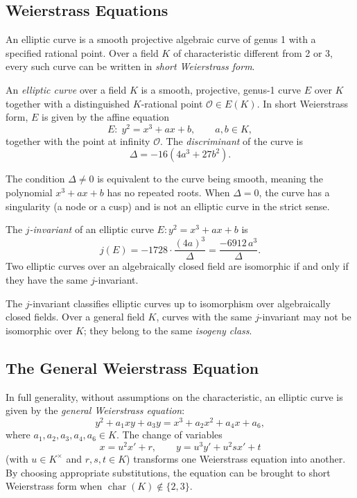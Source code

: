\subsection{Weierstrass Equations}

An elliptic curve is a smooth projective algebraic curve of genus 1 with a specified rational point. Over a field $K$ of characteristic different from 2 or 3, every such curve can be written in \emph{short Weierstrass form}.

\begin{definition}
An \textit{elliptic curve} over a field $K$ is a smooth, projective, genus-1 curve $E$ over $K$ together with a distinguished $K$-rational point $\mathcal{O} \in E(K)$. In short Weierstrass form, $E$ is given by the affine equation
\[
E:\; y^2 = x^3 + ax + b, \qquad a, b \in K,
\]
together with the point at infinity $\mathcal{O}$. The \textit{discriminant} of the curve is
\[
\Delta = -16(4a^3 + 27b^2).
\]
\end{definition}

The condition $\Delta \neq 0$ is equivalent to the curve being smooth, meaning the polynomial $x^3 + ax + b$ has no repeated roots. When $\Delta = 0$, the curve has a singularity (a node or a cusp) and is not an elliptic curve in the strict sense.

\begin{definition}
The \textit{$j$-invariant} of an elliptic curve $E: y^2 = x^3 + ax + b$ is
\[
j(E) = -1728 \cdot \frac{(4a)^3}{\Delta} = \frac{-6912\, a^3}{\Delta}.
\]
Two elliptic curves over an algebraically closed field are isomorphic if and only if they have the same $j$-invariant.
\end{definition}

The $j$-invariant classifies elliptic curves up to isomorphism over algebraically closed fields. Over a general field $K$, curves with the same $j$-invariant may not be isomorphic over $K$; they belong to the same \emph{isogeny class}.

\subsection{The General Weierstrass Equation}

In full generality, without assumptions on the characteristic, an elliptic curve is given by the \emph{general Weierstrass equation}:
\[
y^2 + a_1 xy + a_3 y = x^3 + a_2 x^2 + a_4 x + a_6,
\]
where $a_1, a_2, a_3, a_4, a_6 \in K$. The change of variables
\[
x = u^2 x' + r, \qquad y = u^3 y' + u^2 s x' + t
\]
(with $u \in K^\times$ and $r, s, t \in K$) transforms one Weierstrass equation into another. By choosing appropriate substitutions, the equation can be brought to short Weierstrass form when $\operatorname{char}(K) \notin \{2, 3\}$.


